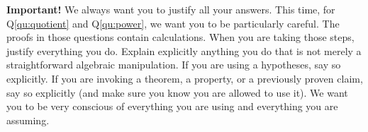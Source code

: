 \documentclass[12pt]{exam}
\begin{document}
\newpage

\begin{framed}
{\bf Important!}  We always want you to justify all your answers.  This time, for Q\ref{qu:quotient} and Q\ref{qu:power}, we want you to be particularly careful.  The proofs in those questions contain calculations.   When you are taking those steps, justify everything you do.  Explain explicitly anything you do that is not merely a straightforward algebraic manipulation.  If you are using a hypotheses, say so explicitly.  If you are invoking a theorem, a property, or a previously proven claim, say so explicitly (and make sure you know you are allowed to use it).  We want you to be very conscious of everything you are using and everything you are assuming.
\end{framed}
\end{document}

